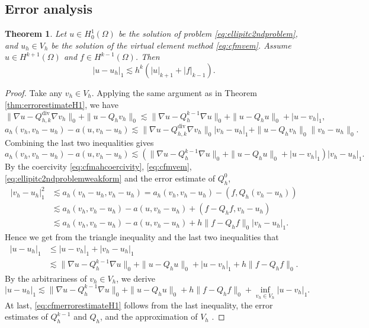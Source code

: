 \documentclass[10pt]{amsart}
\newtheorem{theorem}{Theorem}[section]
\renewcommand{\div}{\operatorname{div}}
\numberwithin{equation}{section}
\begin{document}
\subsection{Error analysis}
\begin{theorem}
Let $u\in H_0^1(\Omega)$ be the solution of problem \eqref{eq:ellipitc2ndproblem}, and $u_h\in V_h$ be the solution of the virtual element method \eqref{eq:cfmvem}. Assume $u\in H^{k+1}(\Omega)$ and $f\in H^{k-1}(\Omega)$. Then
\begin{equation}\label{eq:cfmerrorestimateH1}
|u-u_h|_1\lesssim h^k(|u|_{k+1}+|f|_{k-1}).
\end{equation}
\end{theorem}
\begin{proof}
Take any $v_h\in V_h$. 
Applying the same argument as in Theorem \ref{thm:errorestimateH1}, we have
$$
\|\nabla u-Q_{h,k}^{\div}\nabla v_h\|_0+\|u-Q_hv_h\|_0\lesssim \|\nabla u-Q_h^{k-1}\nabla u\|_0+\|u-Q_hu\|_0+|u-v_h|_1,
$$
$$
a_h(v_h, v_h-u_h)-a(u,v_h-u_h)\lesssim \|\nabla u-Q_{h,k}^{\div}\nabla v_h\|_0|v_h-u_h|_1+\|u-Q_hv_h\|_0\|v_h-u_h\|_0.
$$
Combining the last two inequalities gives
$$
a_h(v_h, v_h-u_h)-a(u,v_h-u_h)\lesssim(\|\nabla u-Q_h^{k-1}\nabla u\|_0+\|u-Q_hu\|_0+|u-v_h|_1)|v_h-u_h|_1.
$$
By the coercivity \eqref{eq:cfmahcoercivity}, \eqref{eq:cfmvem}, \eqref{eq:ellipitc2ndproblemweakform} and the error estimate of $Q_h^0$,
\begin{align*}
|v_h-u_h|_1^2&\lesssim a_h(v_h-u_h, v_h-u_h)=a_h(v_h, v_h-u_h)-(f, Q_h(v_h-u_h)) \\
&\lesssim a_h(v_h, v_h-u_h)-a(u,v_h-u_h)+(f-Q_hf, v_h-u_h) \\
&\lesssim a_h(v_h, v_h-u_h)-a(u,v_h-u_h)+h\|f-Q_hf\|_0|v_h-u_h|_1.
\end{align*}
Hence we get from the triangle inequality and the last two inequalities that
\begin{align*}  
|u-u_h|_1&\leq|u-v_h|_1+|v_h-u_h|_1 \\
&\lesssim \|\nabla u-Q_h^{k-1}\nabla u\|_0+\|u-Q_hu\|_0+|u-v_h|_1+h\|f-Q_hf\|_0.
\end{align*}
By the arbitrariness of $v_h\in V_h$, we derive
$$
|u-u_h|_1\lesssim \|\nabla u-Q_h^{k-1}\nabla u\|_0+\|u-Q_hu\|_0+h\|f-Q_hf\|_0+\inf_{v_h\in V_h}|u-v_h|_1.
$$
At last, \eqref{eq:cfmerrorestimateH1} follows from the last inequality, the error estimates of $Q_h^{k-1}$ and $Q_h$, and the approximation of $V_h$ \cite{Huang2021,ChenHuang2018,BrennerSung2018,BeiraodaVeigaLovadinaRusso2017}.
\end{proof}
\end{document}
